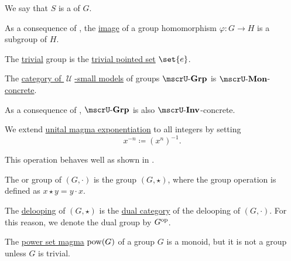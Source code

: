 \begin{definition}
\begin{thmenum}
    We say that \( S \) is a  of \( G \).

    As a consequence of , the \hyperref[def:multi_valued_function/image]{image} of a group homomorphism \( \varphi: G \to H \) is a subgroup of \( H \).

      The \hyperref[thm:substructures_form_complete_lattice/bottom]{trivial} group is the \hyperref[def:pointed_set/trivial]{trivial pointed set} \( \set{ e } \).

     The \hyperref[def:category_of_small_first_order_models]{category of \( \mscrU \)-small models} of groups \( \ucat{Grp} \) is \hyperref[def:unital_magma/monoid]{\( \ucat{Mon} \)}-\hyperref[def:concrete_category]{concrete}.

    As a consequence of , \( \ucat{Grp} \) is also \( \ucat{Inv} \)-concrete.

     We extend \hyperref[def:unital_magma/exponentiation]{unital magma exponentiation} to all integers by setting
    \begin{equation*}
      x^{-n} \coloneqq (x^n)^{-1}.
    \end{equation*}

    This operation behaves well as shown in .

     The  or  group of \( (G, \cdot) \) is the group \( (G, \star) \), where the group operation is defined as \( x \star y = y \cdot x \).

    The \hyperref[def:monoid_delooping]{delooping} of \( (G, \star) \) is the \hyperref[def:dual_category]{dual category} of the delooping of \( (G, \cdot) \). For this reason, we denote the dual group by \( G^{\operatorname{op}} \).
  \end{thmenum}
\end{definition}

\begin{example}\label{ex:power_set_is_not_a_group}
  The \hyperref[def:magma/power_set]{power set magma} \( \operatorname{pow}(G) \) of a group \( G \) is a monoid, but it is not a group unless \( G \) is trivial.
\end{example}

